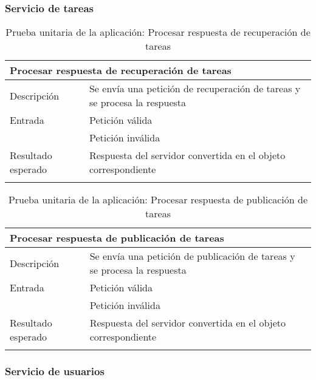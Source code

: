 \vspace{-21pt}
\subsubsection{Servicio de tareas}

\vspace{-5pt}
\begin{longtable}{|p{} p{}|}
    \hline
    \multicolumn{2}{|l|}{\textbf{Procesar respuesta de recuperación de tareas}} \\ \hline 
    Descripción                 & Se envía una petición de recuperación de tareas y se procesa la respuesta \\ \hline
    Entrada                     & Petición válida \\
                                & Petición inválida \\ \hline
    Resultado esperado          & Respuesta del servidor convertida en el objeto correspondiente \\ \hline
    \caption{Prueba unitaria de la aplicación: Procesar respuesta de recuperación de tareas}
    \label{cp:u:app:respuesta_recuperacion_tareas}
\end{longtable}

\begin{longtable}{|p{} p{}|}
    \hline
    \multicolumn{2}{|l|}{\textbf{Procesar respuesta de publicación de tareas}} \\ \hline 
    Descripción                 & Se envía una petición de publicación de tareas y se procesa la respuesta \\ \hline
    Entrada                     & Petición válida \\
                                & Petición inválida \\ \hline
    Resultado esperado          & Respuesta del servidor convertida en el objeto correspondiente \\ \hline
    \caption{Prueba unitaria de la aplicación: Procesar respuesta de publicación de tareas}
    \label{cp:u:app:respuesta_publicacion_tareas}
\end{longtable}
    
\vspace{-20pt}
\subsubsection{Servicio de usuarios}

